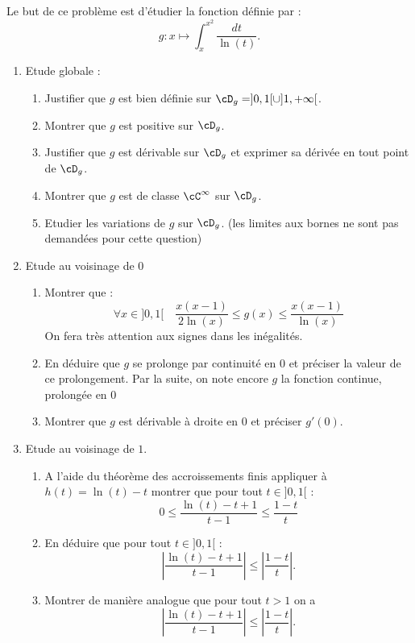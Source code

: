 



\begin{exercice}
Le but de ce problème est d'étudier la fonction définie par : 
$$g : x \mapsto \int_x^{x^2} \frac{dt}{\ln(t)}.$$
\begin{enumerate}
\item Etude globale : 
\begin{enumerate}
\item Justifier que $g$ est bien définie sur $\cD_g = ]0,1[\cup ]1,+\infty[$. 
\item Montrer que $g$ est positive sur $\cD_g$. 
\item Justifier que $g$ est dérivable sur $\cD_g$  et exprimer sa dérivée en tout point de $\cD_g$. 
\item Montrer que $g$ est de classe $\cC^\infty$ sur $\cD_g$. 
\item Etudier les variations de $g$ sur $\cD_g$. (les limites aux bornes ne sont pas demandées pour cette question) 
\end{enumerate}
\item Etude au voisinage de $0$
\begin{enumerate}
\item Montrer que :
$$\forall x\in ]0,1[\quad \frac{x(x-1)}{2\ln(x)}\leq g(x)\leq \frac{x(x-1)}{\ln(x)}$$
On fera très attention aux signes dans les inégalités. 
\item En déduire que $g$ se prolonge par continuité en $0$ et préciser la valeur de ce prolongement. 
Par la suite, on note encore $g$ la fonction continue, prolongée en $0$
\item Montrer que $g$ est dérivable à droite en $0$ et préciser $g'(0)$. 
\end{enumerate}
\item Etude au voisinage de $1$.
\begin{enumerate}
\item A l'aide du théorème des accroissements finis appliquer à $h(t) =\ln(t) -t$ montrer que pour tout $t\in ]0,1[ $ :
$$0\leq \frac{\ln(t) - t+ 1 }{t-1}\leq \frac{1-t}{t} $$
\item En déduire que pour tout $t\in ]0,1[ $ :
$$\left|\frac{\ln(t) - t+ 1 }{t-1}\right|\leq \left|\frac{1-t}{t}\right|.$$
\item Montrer de manière analogue que pour tout $t>1$ on  a
$$\left|\frac{\ln(t) - t+ 1 }{t-1}\right|\leq \left|\frac{1-t}{t}\right|.$$


\end{enumerate}
\end{enumerate}
\end{exercice}
